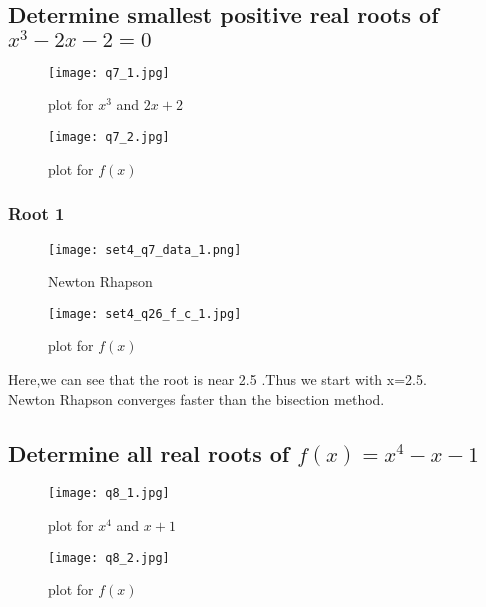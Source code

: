 \documentclass[a4paper]{article}
\begin{document}
        
        \subsection{Determine smallest positive real roots of $x^3 -2x -2=0 $}
            \begin{figure}[!htbp]
              \centering
              \begin{minipage}[b]{0.45\textwidth}
                \texttt{[image: q7\_1.jpg]}
                \caption{plot for $x^3$ and $ 2x+2$}
              \end{minipage}
              \hfill
              \begin{minipage}[b]{0.45\textwidth}
                \texttt{[image: q7\_2.jpg]}
                \caption{plot for $f(x)$}
              \end{minipage}
            \end{figure}
        \subsubsection{Root 1}
             \begin{figure}[!htbp]
              \centering
              \begin{minipage}[b]{0.45\textwidth}
\texttt{[image: set4\_q7\_data\_1.png]}
                \caption{Newton Rhapson }
              \end{minipage}
              \hfill
              \begin{minipage}[b]{0.45\textwidth}
                \texttt{[image: set4\_q26\_f\_c\_1.jpg]}
                \caption{plot for $f(x)$}
              \end{minipage}
            \end{figure}
            \Large{Here,we can see that the root is near 2.5 .Thus we start with x=2.5.\\Newton Rhapson converges faster than the bisection method.}
            \newpage
            
            
         \subsection{Determine all real roots of $f(x)=x^4 - x-1$}
            \begin{figure}[!htbp]
              \centering
              \begin{minipage}[b]{0.45\textwidth}
                \texttt{[image: q8\_1.jpg]}
                \caption{plot for $x^4$ and $ x+1$ }
              \end{minipage}
              \hfill
              \begin{minipage}[b]{0.45\textwidth}
                \texttt{[image: q8\_2.jpg]}
                 \caption{plot for $f(x)$}
              \end{minipage}
            \end{figure}
\end{document}
